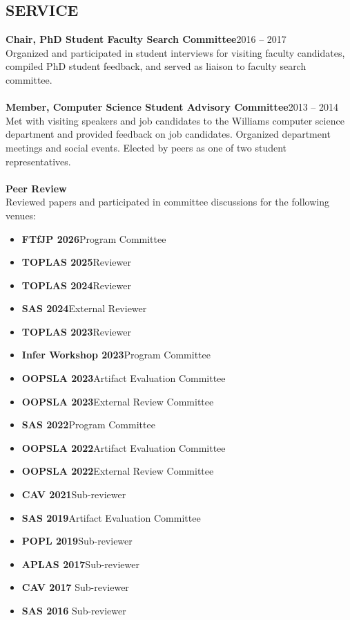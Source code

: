 \documentclass[margin,10pt]{res}
\begin{document}
\begin{resume}
\section{SERVICE}
{\bf Chair, PhD Student Faculty Search Committee}\hfill{2016 -- 2017}\\
Organized and participated in student interviews for visiting faculty candidates, compiled PhD student feedback, and served as liaison to faculty search committee.\\\\
{\bf Member, Computer Science Student Advisory Committee}\hfill{2013 -- 2014}\\
Met with visiting speakers and job candidates to the Williams computer science department and provided feedback on job candidates.  Organized department meetings and social events.  Elected by peers as one of two student representatives.\\\\
{\bf Peer Review}\\
Reviewed papers and participated in committee discussions for the following venues:
\begin{itemize}[topsep=0.5em,leftmargin=2em]
\item[-] {\bf FTfJP 2026}\hfill Program Committee
\item[-] {\bf TOPLAS 2025}\hfill Reviewer
\item[-] {\bf TOPLAS 2024}\hfill Reviewer
\item[-] {\bf SAS 2024}\hfill External Reviewer
\item[-] {\bf TOPLAS 2023}\hfill Reviewer
\item[-] {\bf Infer Workshop 2023}\hfill Program Committee
\item[-] {\bf OOPSLA 2023}\hfill Artifact Evaluation Committee
\item[-] {\bf OOPSLA 2023}\hfill External Review Committee
\item[-] {\bf SAS 2022}\hfill Program Committee
\item[-] {\bf OOPSLA 2022}\hfill Artifact Evaluation Committee
\item[-] {\bf OOPSLA 2022}\hfill External Review Committee
\item[-] {\bf CAV 2021}\hfill Sub-reviewer
\item[-] {\bf SAS 2019}\hfill Artifact Evaluation Committee
\item[-] {\bf POPL 2019}\hfill Sub-reviewer
\item[-] {\bf APLAS 2017}\hfill Sub-reviewer
\item[-] {\bf CAV 2017} \hfill Sub-reviewer
\item[-] {\bf SAS 2016} \hfill Sub-reviewer
\end{itemize}
\end{resume}
\end{document}
